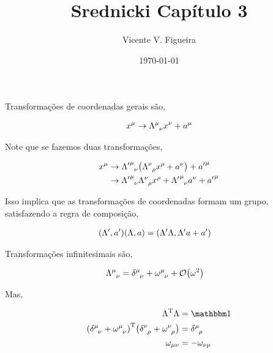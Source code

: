 \documentclass[twoside]{amsart}
\title{
Srednicki Capítulo 3
}
\author{
  Vicente V. Figueira
       }
\date{\today}
\numberwithin{equation}{section}
\begin{document}
\maketitle

\tableofcontents


\section{}

Transformações de coordenadas gerais são,

\begin{align*}
    x^\mu\rightarrow \tensor{\Lambda}{^\mu_\nu}x^\nu+a^\mu
\end{align*}

Note que se fazemos duas transformações,

\begin{align*}
    x^\mu&\rightarrow \tensor{{\Lambda'}}{^\mu_\nu}\qty(\tensor{\Lambda}{^\nu_\rho}x^\rho+a^\nu)+{a'}^\mu\\
    &\rightarrow \tensor{{\Lambda'}}{^\mu_\nu}\tensor{\Lambda}{^\nu_\rho}x^\rho+\tensor{{\Lambda'}}{^\mu_\nu}a^\nu+{a'}^\mu
\end{align*}

Isso implica que as transformações de coordenadas formam um grupo, satisfazendo a regra de composição,

\begin{align*}
    \qty(\Lambda',a')\qty(\Lambda,a)&=\qty(\Lambda'\Lambda,\Lambda'a+a')
\end{align*}

Transformações infinitesimais são,

\begin{align*}
    \tensor{\Lambda}{^\mu_\nu}&=\tensor{\delta}{^\mu_\nu}+\tensor{\omega}{^\mu_\nu}+\mathcal O\qty(\omega^2)
\end{align*}

Mas,

\begin{align*}
    \Lambda^\textnormal{T}\Lambda&=\mathbbm 1\\
    \qty(\tensor{\delta}{^\mu_\nu}+\tensor{\omega}{^\mu_\nu})^\textnormal{T}\qty(\tensor{\delta}{^\nu_\rho}+\tensor{\omega}{^\nu_\rho})&=\tensor{\delta}{^\mu_\rho}\\
    \omega_{\mu\nu}&=-\omega_{\nu\mu}
\end{align*}
\end{document}
